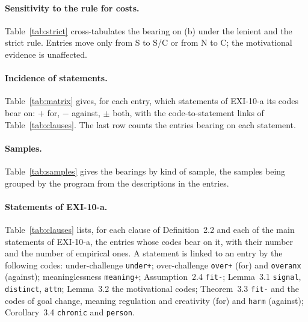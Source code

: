\documentclass{situationist-preprint}
\begin{document}
\paragraph{Sensitivity to the rule for costs.} Table~\ref{tab:strict} cross-tabulates the bearing on (b) under the lenient and the strict rule. Entries move only from S to S/C or from N to C; the motivational evidence is unaffected.

\begin{table}[h]\caption{Function thesis: lenient against strict rule.}\label{tab:strict}

\end{table}

\paragraph{Incidence of statements.} Table~\ref{tab:matrix} gives, for each entry, which statements of EXI-10-a its codes bear on: $+$ for, $-$ against, $\pm$ both, with the code-to-statement links of Table~\ref{tab:clauses}. The last row counts the entries bearing on each statement.



\paragraph{Samples.} Table~\ref{tab:samples} gives the bearings by kind of sample, the samples being grouped by the program from the descriptions in the entries.

\begin{table}[h]\caption{Bearings by kind of sample.}\label{tab:samples}

\end{table}

\paragraph{Statements of EXI-10-a.} Table~\ref{tab:clauses} lists, for each clause of Definition~2.2 and each of the main statements of EXI-10-a, the entries whose codes bear on it, with their number and the number of empirical ones. A statement is linked to an entry by the following codes: under-challenge \texttt{under+}; over-challenge \texttt{over+} (for) and \texttt{overanx} (against); meaninglessness \texttt{meaning+}; Assumption~2.4 \texttt{fit-}; Lemma~3.1 \texttt{signal}, \texttt{distinct}, \texttt{attn}; Lemma~3.2 the motivational codes; Theorem~3.3 \texttt{fit-} and the codes of goal change, meaning regulation and creativity (for) and \texttt{harm} (against); Corollary~3.4 \texttt{chronic} and \texttt{person}.
\end{document}

